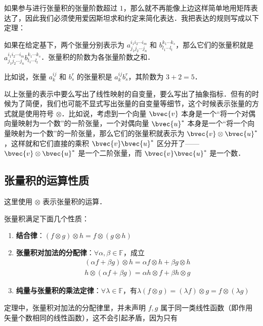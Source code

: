 如果参与进行张量积的张量阶数超过 $1$，那么就不再能像上边这样简单地用矩阵表达了，因此我们必须使用爱因斯坦求和约定来简化表达．我把表达的规则写成以下定理：

\begin{theorem}{}
如果在给定基下，两个张量分别表示为 $a^{i_1i_2\cdots i_m}_{j_1j_2\cdots j_n}$ 和 $b^{k_1\cdots k_s}_{l_1\cdots l_t}$，那么它们的张量积就是 $a^{i_1i_2\cdots i_m}_{j_1j_2\cdots j_n}b^{k_1\cdots k_s}_{l_1\cdots l_t}$．张量积的阶数为各张量阶数之和．
\end{theorem}

比如说，张量 $a^{ij}_k$ 和 $b^r_s$ 的张量积是 $a^{ij}_kb^r_s$，其阶数为 $3+2=5$．

以上张量的表示中要么写出了线性映射的自变量，要么写出了抽象指标．但有的时候为了简便，我们也可能不显式写出张量的自变量等细节，这个时候表示张量的方式就是使用符号 $\otimes$．比如说，考虑到一个向量 $\bvec{v}$ 本身是一个“将一个对偶向量映射为一个数”的一阶张量，一个对偶向量 $\bvec{u}^*$ 本身是一个“将一个向量映射为一个数”的一阶张量，那么它们的张量积就表示为 $\bvec{v}\otimes\bvec{u}^*$，这样就和它们直接的乘积 $\bvec{v}\bvec{u}^*$ 区分开了——$\bvec{v}\otimes\bvec{u}^*$ 是一个二阶张量，而 $\bvec{v}\bvec{u}^*$ 是一个数．

\subsection{张量积的运算性质}
这里使用 $\otimes$ 表示张量积的运算．
\begin{theorem}{}
张量积满足下面几个性质：
\begin{enumerate}
\item \textbf{结合律}：$(f\otimes g)\otimes h=f\otimes (g\otimes h)$
\item \textbf{张量积对加法的分配律}：$\forall \alpha,\beta\in\mathbb F$，成立
\begin{equation}
\begin{aligned}
(\alpha f+\beta g)\otimes h=\alpha f\otimes h+\beta g\otimes h\\
h\otimes(\alpha f+\beta g)=\alpha h\otimes f+\beta h\otimes g
\end{aligned}
\end{equation}
\item \textbf{纯量与张量积的乘法定律}：$\forall \lambda\in\mathbb F$，有$\lambda (f\otimes g)=(\lambda f)\otimes g=f\otimes (\lambda g)$
\end{enumerate}
\end{theorem}
定理中，张量积对加法的分配律里，并未声明 $f,g$ 属于同一类线性函数（即作用矢量个数相同的线性函数），这不会引起矛盾，因为只有
